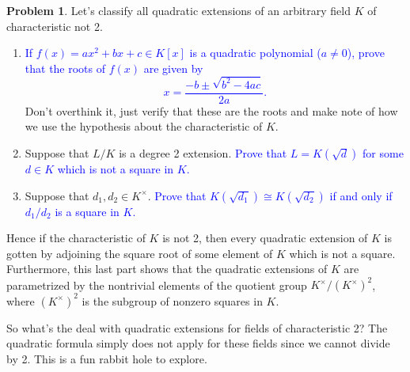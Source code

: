 \documentclass[11pt]{article}
\theoremstyle{definition}
\newtheorem{problem}{Problem}[section]
\numberwithin{equation}{subsection}
\newcommand{\blue}[1]{\textcolor{blue}{#1}}
\begin{document}
\begin{problem}
    Let's classify all quadratic extensions of an arbitrary field $K$ of characteristic not 2.
    \begin{enumerate}
        \item \blue{If $f(x) = ax^2 + bx + c \in K[x]$ is a quadratic polynomial ($a \neq 0$), prove that the roots of $f(x)$ are given by
        \[
            x = \frac{-b \pm \sqrt{b^2 - 4ac}}{2a}.
        \]
        }
        Don't overthink it, just verify that these are the roots and make note of how we use the hypothesis about the characteristic of $K$.

        \item Suppose that $L/K$ is a degree 2 extension.
        \blue{Prove that $L = K(\sqrt{d})$ for some $d \in K$ which is not a square in $K$.}

        \item Suppose that $d_1, d_2 \in K^\times$.
        \blue{Prove that $K(\sqrt{d_1}) \cong K(\sqrt{d_2})$ if and only if $d_1/d_2$ is a square in $K$.}
    \end{enumerate}

    Hence if the characteristic of $K$ is not 2, then every quadratic extension of $K$ is gotten by adjoining the square root of some element of $K$ which is not a square.
    Furthermore, this last part shows that the quadratic extensions of $K$ are parametrized by the nontrivial elements of the quotient group $K^\times/(K^\times)^2$, where $(K^\times)^2$ is the subgroup of nonzero squares in $K$.
\end{problem}

    So what's the deal with quadratic extensions for fields of characteristic 2?
    The quadratic formula simply does not apply for these fields since we cannot divide by 2.
    This is a fun rabbit hole to explore.
\end{document}
